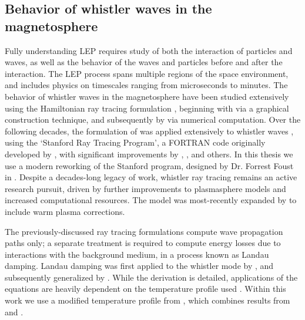 \subsection{Behavior of whistler waves in the magnetosphere}
Fully understanding LEP requires study of both the interaction of particles and waves, as well as the behavior of the waves and particles before and after the interaction. The LEP process spans multiple regions of the space environment, and includes physics on timescales ranging from microseconds to minutes. The behavior of whistler waves in the magnetosphere have been studied extensively using the Hamiltonian ray tracing formulation \citep{Stix1992, Landau1975}, beginning with \cite{Haselgrove1955} via a graphical construction technique, and subsequently by \cite{Haselgrove1960} via numerical computation. Over the following decades, the formulation of \citeauthor{Haselgrove1955} was applied extensively to whistler waves \citep{Kimura1966, Edgar1972}, using the `Stanford Ray Tracing Program', a FORTRAN code originally developed by \cite{Walter1969}, with significant improvements by \cite{Inan1977b}, \cite{Ngo1989}, and others. In this thesis we use a modern reworking of the Stanford program, designed by Dr. Forrest Foust in \cite{Golden2010}. Despite a decades-long legacy of work, whistler ray tracing remains an active research pursuit, driven by further improvements to plasmasphere models and increased computational resources. The \citeauthor{Golden2010} model was most-recently expanded by \cite{Maxworth2017} to include warm plasma corrections.

The previously-discussed ray tracing formulations compute wave propagation paths only; a separate treatment is required to compute energy losses due to interactions with the background medium, in a process known as Landau damping. Landau damping was first applied to the whistler mode by \cite{Kennel1966}, and subsequently generalized by \cite{Brinca1972}. While the derivation is detailed, applications of the \citeauthor{Brinca1972} equations are heavily dependent on the temperature profile used \citep{Thorne1994, Bell2002}. Within this work we use a modified temperature profile from \cite{Golden2010}, which combines results from \cite{Bell2002} and \cite{Bortnik2007}.

